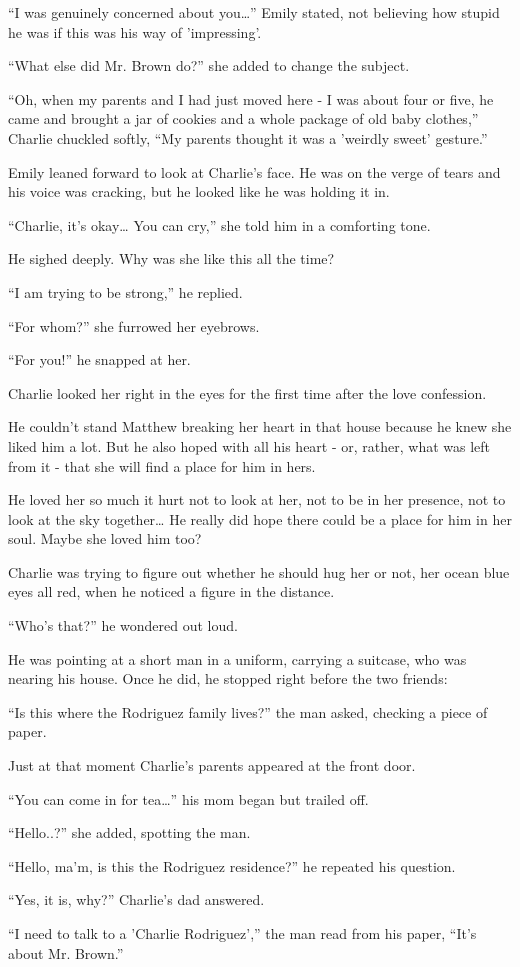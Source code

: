 “I was genuinely concerned about you…” Emily stated, not believing how stupid he was if this was his way of 'impressing'.

“What else did Mr. Brown do?” she added to change the subject.

“Oh, when my parents and I had just moved here - I was about four or five, he came and brought a jar of cookies and a whole package of old baby clothes,” Charlie chuckled softly, “My parents thought it was a 'weirdly sweet' gesture.”

Emily leaned forward to look at Charlie's face. He was on the verge of tears and his voice was cracking, but he looked like he was holding it in.

“Charlie, it's okay… You can cry,” she told him in a comforting tone.

He sighed deeply. Why was she like this all the time?

“I am trying to be strong,” he replied.

“For whom?” she furrowed her eyebrows.

“For you!” he snapped at her.

Charlie looked her right in the eyes for the first time after the love confession.

He couldn't stand Matthew breaking her heart in that house because he knew she liked him a lot. But he also hoped with all his heart - or, rather, what was left from it - that she will find a place for him in hers.

He loved her so much it hurt not to look at her, not to be in her presence, not to look at the sky together… He really did hope there could be a place for him in her soul. Maybe she loved him too?

Charlie was trying to figure out whether he should hug her or not, her ocean blue eyes all red, when he noticed a figure in the distance.

“Who's that?” he wondered out loud.

He was pointing at a short man in a uniform, carrying a suitcase, who was nearing his house. Once he did, he stopped right before the two friends:

“Is this where the Rodriguez family lives?” the man asked, checking a piece of paper.

Just at that moment Charlie's parents appeared at the front door.

“You can come in for tea…” his mom began but trailed off.

“Hello..?” she added, spotting the man.

“Hello, ma'm, is this the Rodriguez residence?” he repeated his question.

“Yes, it is, why?” Charlie's dad answered.

“I need to talk to a 'Charlie Rodriguez',” the man read from his paper, “It's about Mr. Brown.”